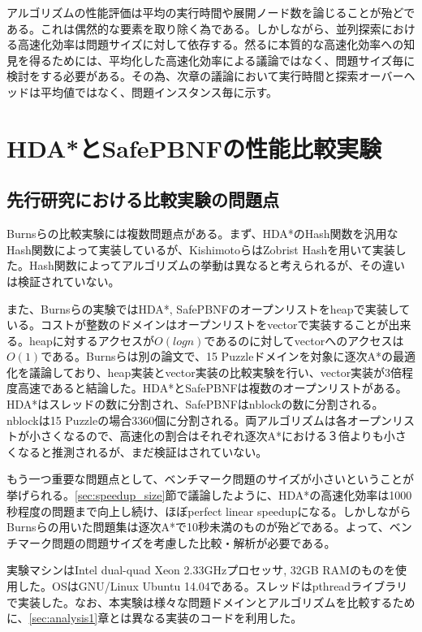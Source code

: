 \documentclass[uplatex]{jsarticle}
\begin{document}
アルゴリズムの性能評価は平均の実行時間や展開ノード数を論じることが殆どである。これは偶然的な要素を取り除く為である。しかしながら、並列探索における高速化効率は問題サイズに対して依存する。然るに本質的な高速化効率への知見を得るためには、平均化した高速化効率による議論ではなく、問題サイズ毎に検討をする必要がある。その為、次章の議論において実行時間と探索オーバーヘッドは平均値ではなく、問題インスタンス毎に示す。

\newpage

\section{HDA*とSafePBNFの性能比較実験}
\label{sec:analysis2}

\subsection{先行研究における比較実験の問題点}

Burnsらの比較実験には複数問題点がある\cite{Burns2010}。まず、HDA*のHash関数を汎用なHash関数によって実装しているが、KishimotoらはZobrist Hashを用いて実装した。Hash関数によってアルゴリズムの挙動は異なると考えられるが、その違いは検証されていない。

また、Burnsらの実験ではHDA*, SafePBNFのオープンリストをheapで実装している。コストが整数のドメインはオープンリストをvectorで実装することが出来る。heapに対するアクセスが$O(logn)$であるのに対してvectorへのアクセスは$O(1)$である。Burnsらは別の論文で、15 Puzzleドメインを対象に逐次A*の最適化を議論しており、heap実装とvector実装の比較実験を行い、vector実装が3倍程度高速であると結論した\cite{Burns2012implementing}。HDA*とSafePBNFは複数のオープンリストがある。HDA*はスレッドの数に分割され、SafePBNFはnblockの数に分割される。nblockは15 Puzzleの場合3360個に分割される。両アルゴリズムは各オープンリストが小さくなるので、高速化の割合はそれぞれ逐次A*における３倍よりも小さくなると推測されるが、まだ検証はされていない。

もう一つ重要な問題点として、ベンチマーク問題のサイズが小さいということが挙げられる。\ref{sec:speedup_size}節で議論したように、HDA*の高速化効率は1000秒程度の問題まで向上し続け、ほぼperfect linear speedupになる。しかしながらBurnsらの用いた問題集は逐次A*で10秒未満のものが殆どである。よって、ベンチマーク問題の問題サイズを考慮した比較・解析が必要である。
\newline

実験マシンはIntel dual-quad Xeon 2.33GHzプロセッサ, 32GB RAMのものを使用した。OSはGNU/Linux Ubuntu 14.04である。スレッドはpthreadライブラリで実装した。なお、本実験は様々な問題ドメインとアルゴリズムを比較するために、\ref{sec:analysis1}章とは異なる実装のコードを利用した。
\end{document}
